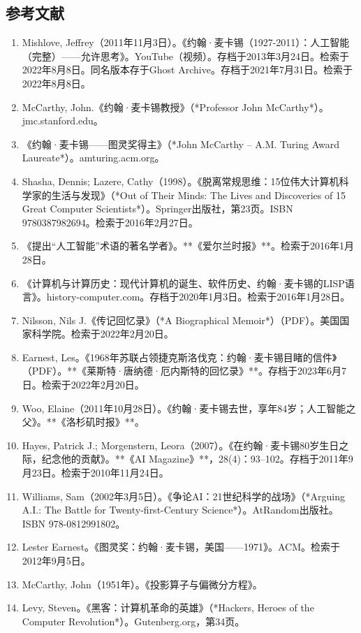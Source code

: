 \subsection{参考文献}
\begin{enumerate}
\item Mishlove, Jeffrey（2011年11月3日）。《约翰·麦卡锡（1927-2011）：人工智能（完整）——允许思考》。YouTube（视频）。存档于2013年3月24日。检索于2022年8月8日。同名版本存于Ghost Archive。存档于2021年7月31日。检索于2022年8月8日。
\item McCarthy, John.《约翰·麦卡锡教授》（*Professor John McCarthy*）。jmc.stanford.edu。
\item 《约翰·麦卡锡——图灵奖得主》（*John McCarthy – A.M. Turing Award Laureate*）。amturing.acm.org。
\item Shasha, Dennis; Lazere, Cathy（1998）。《脱离常规思维：15位伟大计算机科学家的生活与发现》（*Out of Their Minds: The Lives and Discoveries of 15 Great Computer Scientists*）。Springer出版社，第23页。ISBN 9780387982694。检索于2016年2月27日。
\item 《提出“人工智能”术语的著名学者》。**《爱尔兰时报》**。检索于2016年1月28日。
\item 《计算机与计算历史：现代计算机的诞生、软件历史、约翰·麦卡锡的LISP语言》。history-computer.com。存档于2020年1月3日。检索于2016年1月28日。
\item Nilsson, Nils J.《传记回忆录》（*A Biographical Memoir*）（PDF）。美国国家科学院。检索于2022年2月20日。
\item Earnest, Les。《1968年苏联占领捷克斯洛伐克：约翰·麦卡锡目睹的信件》（PDF）。**《莱斯特·唐纳德·厄内斯特的回忆录》**。存档于2023年6月7日。检索于2022年2月20日。
\item Woo, Elaine（2011年10月28日）。《约翰·麦卡锡去世，享年84岁；人工智能之父》。**《洛杉矶时报》**。
\item Hayes, Patrick J.; Morgenstern, Leora（2007）。《在约翰·麦卡锡80岁生日之际，纪念他的贡献》。**《AI Magazine》**，28(4)：93–102。存档于2011年9月23日。检索于2010年11月24日。
\item Williams, Sam（2002年3月5日）。《争论AI：21世纪科学的战场》（*Arguing A.I.: The Battle for Twenty-first-Century Science*）。AtRandom出版社。ISBN 978-0812991802。
\item Lester Earnest。《图灵奖：约翰·麦卡锡，美国——1971》。ACM。检索于2012年9月5日。
\item McCarthy, John（1951年）。《投影算子与偏微分方程》。
\item Levy, Steven。《黑客：计算机革命的英雄》（*Hackers, Heroes of the Computer Revolution*）。Gutenberg.org，第34页。

\end{enumerate}

